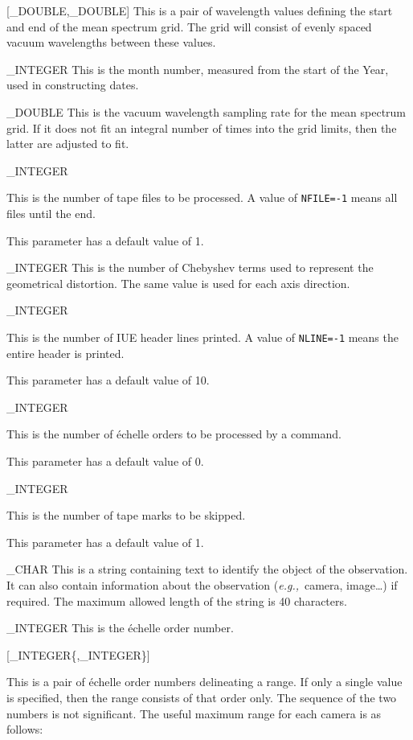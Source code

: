 {
{
   [\_DOUBLE,\_DOUBLE]
}{
   This is a pair of wavelength values defining the start and end of
   the mean spectrum grid.
   The grid will consist of evenly spaced vacuum wavelengths between these
   values.
}

{
   \_INTEGER
}{
   This is the month number, measured from the start of the Year,
   used in constructing dates.
}

{
   \_DOUBLE
}{
   This is the vacuum wavelength sampling rate for the mean spectrum grid.
   If it does not fit an integral number of times into the grid limits,
   then the latter are adjusted to fit.
}

{
   \_INTEGER
}{
   This is the number of tape files to be processed.
   A value of \verb+NFILE=-1+ means all files until the end.

   This parameter has a default value of 1.
}

{
   \_INTEGER
}{
   This is the number of Chebyshev terms used to represent the
   geometrical distortion.
   The same value is used for each axis direction.
}

{
   \_INTEGER
}{
   This is the number of IUE header lines printed.
   A value of \verb+NLINE=-1+ means the entire header is printed.

   This parameter has a default value of 10.
}

{
   \_INTEGER
}{
   This is the number of \'{e}chelle orders to be processed by a command.

   This parameter has a default value of 0.
}

{
   \_INTEGER
}{
   This is the number of tape marks to be skipped.

   This parameter has a default value of 1.
}

{
   \_CHAR
}{
   This is a string containing text to identify the object of the
   observation.
   It can also contain information about the observation
   ({\it{e.g.,}}\ camera, image\ldots ) if required.
   The maximum allowed length of the string is 40 characters.
}

{
   \_INTEGER
}{
   This is the \'{e}chelle order number.
}

{
   [\_INTEGER\{,\_INTEGER\}]
}{
   This is a pair of \'{e}chelle order numbers delineating a range.
   If only a single value is specified, then the range consists of that
   order only.
   The sequence of the two numbers is not significant.
   The useful maximum range for each camera is as follows:

}}
